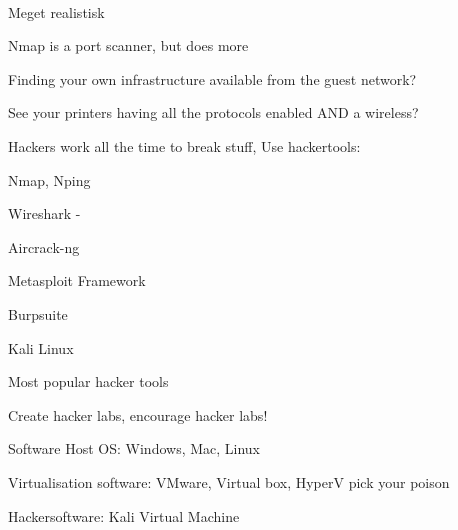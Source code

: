 \documentclass[Screen16to9,17pt]{foils}
\begin{document}

\\
Meget realistisk 





\begin{list2}
\item Nmap is a port scanner, but does more
\item Finding your own infrastructure available from the guest network?
\item See your printers having all the protocols enabled AND a wireless?
\end{list2}



\begin{list2}
\item Hackers work all the time to break stuff, Use hackertools:
\item Nmap, Nping 
\item Wireshark - 
\item Aircrack-ng 
\item Metasploit Framework 
\item Burpsuite 
\item Kali Linux 
\end{list2}

\vskip 5mm
\centerline{Most popular hacker tools }




\begin{list2}
\item Create hacker labs, encourage hacker labs!
\item Software Host OS: Windows, Mac, Linux
\item Virtualisation software: VMware, Virtual box, HyperV pick your poison
\item Hackersoftware: Kali Virtual Machine 
\end{list2}
\end{document}
